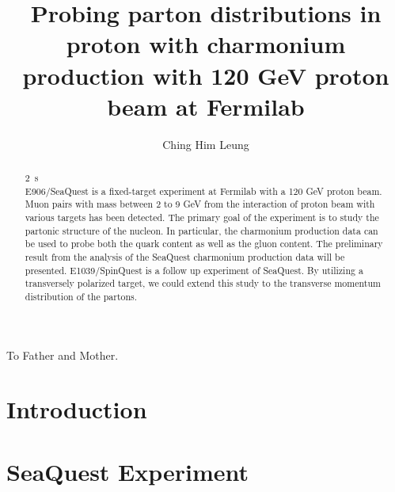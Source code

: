 \documentclass{uiucthesis2021}
\begin{document}
\title{Probing parton distributions in proton with charmonium production with
	120 GeV proton beam at Fermilab}
\author{Ching Him Leung}
\phdthesis
{}
\maketitle

\frontmatter

\begin{abstract}
\SI{2}{\second}\\
E906/SeaQuest is a fixed-target experiment at Fermilab with a 120 GeV proton 
beam. Muon pairs with mass between 2 to 9 GeV from the interaction of 
proton beam with various targets has been detected. The primary goal of the 
experiment is to study the partonic structure of the nucleon. In particular, 
the charmonium production data can be used to probe both the quark content as 
well as the gluon content. The preliminary result from the analysis of the 
SeaQuest charmonium production data will be presented.  E1039/SpinQuest is a 
follow up experiment of SeaQuest. By utilizing a transversely polarized target,
we could extend this study to the transverse momentum distribution of the 
partons. 
\end{abstract}

\begin{dedication}
To Father and Mother.
\end{dedication}



{
	\hypersetup{linkcolor=black}  %
	\tableofcontents
	\listoffigures
}


\mainmatter

\chapter{Introduction}


\chapter{SeaQuest Experiment}

\end{document}
